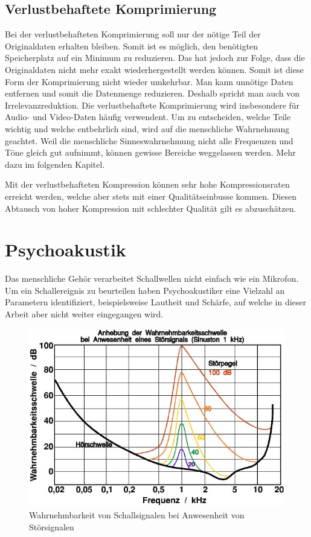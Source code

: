 \begin{refsection}
\subsection{Verlustbehaftete Komprimierung}
Bei der verlustbehafteten Komprimierung soll nur der nötige Teil der Originaldaten erhalten bleiben.
Somit ist es möglich, den benötigten Speicherplatz auf ein Minimum zu reduzieren.
Das hat jedoch zur Folge, dass die Originaldaten nicht mehr exakt wiederhergestellt werden können. 
Somit ist diese Form der Komprimierung nicht wieder umkehrbar.
Man kann unnötige Daten entfernen und somit die Datenmenge reduzieren.
Deshalb spricht man auch von Irrelevanzreduktion.
Die verlustbehaftete Komprimierung wird insbesondere für Audio- und Video-Daten häufig verwendent.
Um zu entscheiden, welche Teile wichtig und welche entbehrlich sind, wird auf die menschliche Wahrnehmung geachtet.
Weil die menschliche Sinneswahrnehmung nicht alle Frequenzen und Töne gleich gut aufnimmt, können gewisse Bereiche weggelassen werden.
Mehr dazu im folgenden Kapitel.

Mit der verlustbehafteten Kompression können sehr hohe Kompressionsraten erreicht werden, welche aber stets mit einer Qualitätseinbusse kommen.
Diesen Abtausch von hoher Kompression mit schlechter Qualität gilt es abzuschätzen.

\section{Psychoakustik}
Das menschliche Gehör verarbeitet Schallwellen nicht einfach wie ein Mikrofon.
Um ein Schallereignis zu beurteilen haben Psychoakustiker eine Vielzahl an Parametern identifiziert, beispielsweise Lautheit und Schärfe, auf welche in dieser Arbeit aber nicht weiter eingegangen wird.

\begin{figure}
	\centering
	\includegraphics[width=0.6\linewidth]{papers/compress/Bilder/Akustik_Mithoerschwelle2}
	\caption{Wahrnehmbarkeit von Schallsignalen bei Anwesenheit von Störsignalen \cite{skript:Akustik2}}
	\label{fig:Wahrnehmbarkeitsschwelle}
\end{figure}


\end{refsection}
